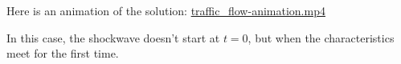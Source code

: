\begin{solution}
\begin{slide}
\begin{parts}
Here is an animation of the solution: \href{https://raw.githubusercontent.com/bigfatbernie/IBLMathModeling/main/book/images/traffic_flow-animation.mp4}{traffic_flow-animation.mp4}



\item In this case, the shockwave doesn't start at $t=0$, but when the characteristics meet for the first time.

\end{parts}
	
\end{slide}
	
\end{solution}







